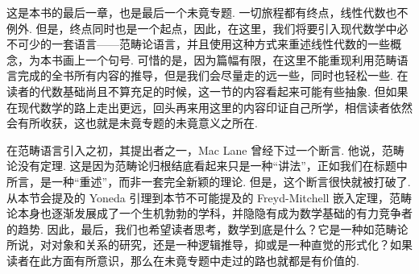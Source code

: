 



这是本书的最后一章，也是最后一个未竟专题. 一切旅程都有终点，线性代数也不例外. 但是，终点同时也是一个起点，因此，在这里，我们将要引入现代数学中必不可少的一套语言——范畴论语言，并且使用这种方式来重述线性代数的一些概念，为本书画上一个句号. 可惜的是，因为篇幅有限，在这里不能重现利用范畴语言完成的全书所有内容的推导，但是我们会尽量走的远一些，同时也轻松一些. 在读者的代数基础尚且不算充足的时候，这一节的内容看起来可能有些抽象. 但如果在现代数学的路上走出更远，回头再来用这里的内容印证自己所学，相信读者依然会有所收获，这也就是未竟专题的未竟意义之所在.

在范畴语言引入之初，其提出者之一，Mac Lane 曾经下过一个断言. 他说，范畴论没有定理. 这是因为范畴论归根结底看起来只是一种``讲法''，正如我们在标题中所言，是一种``重述''，而非一套完全新颖的理论. 但是，这个断言很快就被打破了. 从本节会提及的 Yoneda 引理到本节不可能提及的 Freyd-Mitchell 嵌入定理，范畴论本身也逐渐发展成了一个生机勃勃的学科，并隐隐有成为数学基础的有力竞争者的趋势. 因此，最后，我们也希望读者思考，数学到底是什么？它是一种如范畴论所说，对对象和关系的研究，还是一种逻辑推导，抑或是一种直觉的形式化？如果读者在此方面有所意识，那么在未竟专题中走过的路也就都是有价值的.

